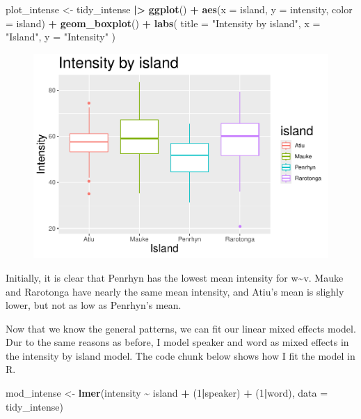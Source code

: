 \documentclass[
  ,man,floatsintext]{apa6}
\newenvironment{Shaded}{\begin{snugshade}}{\end{snugshade}}
\newcommand{\AttributeTok}[1]{\textcolor[rgb]{0.13,0.29,0.53}{#1}}
\newcommand{\DecValTok}[1]{\textcolor[rgb]{0.00,0.00,0.81}{#1}}
\newcommand{\FunctionTok}[1]{\textcolor[rgb]{0.13,0.29,0.53}{\textbf{#1}}}
\newcommand{\NormalTok}[1]{#1}
\newcommand{\OtherTok}[1]{\textcolor[rgb]{0.56,0.35,0.01}{#1}}
\newcommand{\SpecialCharTok}[1]{\textcolor[rgb]{0.81,0.36,0.00}{\textbf{#1}}}
\newcommand{\StringTok}[1]{\textcolor[rgb]{0.31,0.60,0.02}{#1}}
\begin{document}
\begin{Shaded}
\begin{Highlighting}[]
\NormalTok{plot\_intense }\OtherTok{\textless{}{-}}\NormalTok{ tidy\_intense }\SpecialCharTok{|\textgreater{}}
  \FunctionTok{ggplot}\NormalTok{() }\SpecialCharTok{+}
  \FunctionTok{aes}\NormalTok{(}\AttributeTok{x =}\NormalTok{ island, }\AttributeTok{y =}\NormalTok{ intensity, }\AttributeTok{color =}\NormalTok{ island) }\SpecialCharTok{+}
  \FunctionTok{geom\_boxplot}\NormalTok{() }\SpecialCharTok{+}
  \FunctionTok{labs}\NormalTok{(}
    \AttributeTok{title =} \StringTok{"Intensity by island"}\NormalTok{,}
    \AttributeTok{x =} \StringTok{"Island"}\NormalTok{,}
    \AttributeTok{y =} \StringTok{"Intensity"}
\NormalTok{  ) }
\end{Highlighting}
\end{Shaded}

\begin{figure}

{\centering \includegraphics[width=0.75\linewidth]{D2_CIM_files/figure-latex/print-intensity-plot-1} 

}

\caption{ }\label{fig:print-intensity-plot}
\end{figure}

Initially, it is clear that Penrhyn has the lowest mean intensity for w\textasciitilde v. Mauke and Rarotonga have nearly the same mean intensity, and Atiu's mean is slighly lower, but not as low as Penrhyn's mean.

Now that we know the general patterns, we can fit our linear mixed effects model. Dur to the same reasons as before, I model speaker and word as mixed effects in the intensity by island model. The code chunk below shows how I fit the model in R.

\begin{Shaded}
\begin{Highlighting}[]
\NormalTok{mod\_intense }\OtherTok{\textless{}{-}} \FunctionTok{lmer}\NormalTok{(intensity }\SpecialCharTok{\textasciitilde{}}\NormalTok{ island }\SpecialCharTok{+}\NormalTok{ (}\DecValTok{1}\SpecialCharTok{|}\NormalTok{speaker) }\SpecialCharTok{+}\NormalTok{ (}\DecValTok{1}\SpecialCharTok{|}\NormalTok{word), }\AttributeTok{data =}\NormalTok{ tidy\_intense)}
\end{Highlighting}
\end{Shaded}
\end{document}
